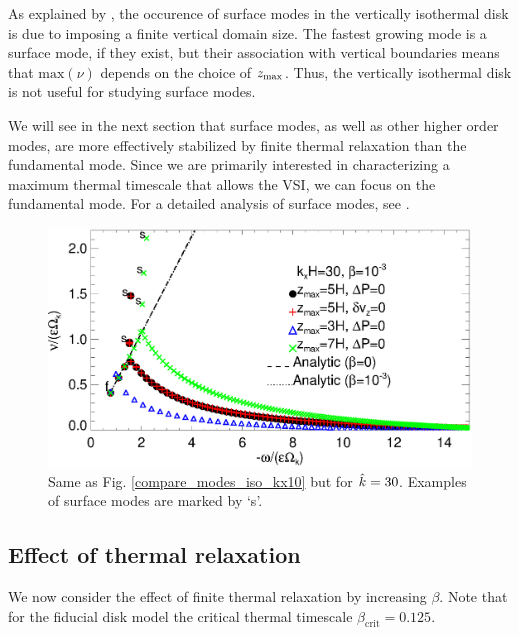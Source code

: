 As explained by \cite{barker15}, the occurence of surface modes in the
vertically isothermal disk is due to imposing a finite vertical domain
size. The fastest growing mode is a surface mode, if they
exist, but their association with vertical boundaries means that
$\mathrm{max}(\nu)$ depends on the choice of $z_\mathrm{max}$. Thus, the
vertically isothermal disk is not useful for studying surface modes. 

We will see in the next section that surface modes, as well
as other higher order modes, are more effectively stabilized by finite
thermal relaxation than the fundamental mode. Since we are primarily
interested in characterizing a maximum thermal timescale that allows
the VSI, we can focus on the fundamental mode. For a detailed analysis of 
surface modes, see \cite{barker15}. 


\begin{figure}
  \includegraphics[width=\linewidth]{figures/compare_modes_iso_kx30_analytic.ps}
  \caption{Same as Fig. \ref{compare_modes_iso_kx10} but for $\hat{k}=30$. Examples of surface modes are
    marked by `s'. \label{compare_modes_iso_kx30}
  }
\end{figure}

\subsection{Effect of thermal relaxation}\label{therm_relax_eff}
We now consider the effect of finite thermal relaxation by increasing 
$\beta$. Note that for the fiducial disk model the critical thermal 
timescale $\beta_\mathrm{crit} = 0.125$.  


